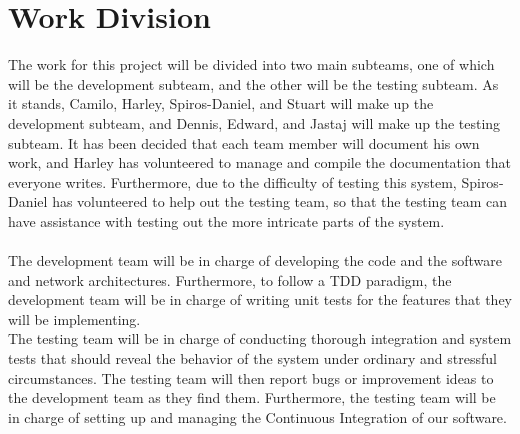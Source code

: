 \documentclass[10pt]{article}
\begin{document}
\section*{Work Division}
The work for this project will be divided into two main subteams, one of which
will be the development subteam, and the other will be the testing subteam. As
it stands, Camilo, Harley, Spiros-Daniel, and Stuart will make up the
development subteam, and Dennis, Edward, and Jastaj will make up the testing
subteam. It has been decided that each team member will document his own work,
and Harley has volunteered to manage and compile the documentation that
everyone writes. Furthermore, due to the difficulty of testing this system,
Spiros-Daniel has volunteered to help out the testing team, so that the testing
team can have assistance with testing out the more intricate parts of the
system.\\\\
The development team will be in charge of developing the code and the software
and network architectures. Furthermore, to follow a TDD paradigm, the
development team will be in charge of writing unit tests for the features that
they will be implementing.\\
The testing team will be in charge of conducting thorough integration and
system tests that should reveal the behavior of the system under ordinary and
stressful circumstances. The testing team will then report bugs or improvement
ideas to the development team as they find them. Furthermore, the testing team
will be in charge of setting up and managing the Continuous Integration of our
software.

%
\end{document}
